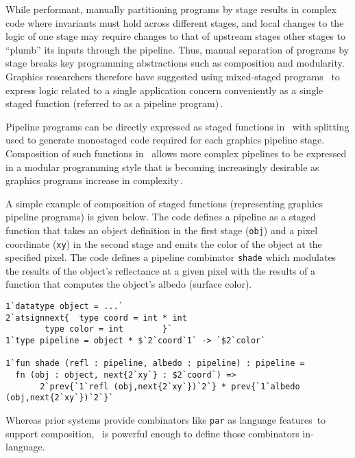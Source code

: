 While performant, manually partitioning programs by stage results in
complex code where invariants must hold across different stages, and
local changes to the logic of one stage may require changes to that of
upstream stages other stages to ``plumb'' its inputs through the
pipeline.  Thus, manual separation of programs by stage breaks key
programming abstractions such as composition and modularity.  Graphics
researchers therefore have suggested using mixed-staged programs
\,\cite{Proudfoot:2001,Foley:2011,He:2014} to express logic related to
a single application concern conveniently as a single staged function
(referred to as a pipeline program)\,\cite{Foley:2011}.

Pipeline programs can be directly expressed as staged functions in
\lang\ with splitting used to generate monostaged code required for
each graphics pipeline stage. Composition of such functions in
\lang\ allows more complex pipelines to be expressed in a modular
programming style that is becoming increasingly desirable as graphics
programs increase in complexity\,\cite{Foley:2011,He:2014}.

A simple example of composition of staged functions (representing graphics
pipeline programs) is given below.  The code defines a pipeline as a
staged function that takes an object definition in the first stage
(\texttt{obj}) and a pixel coordinate (\texttt{xy}) in the second
stage and emits the color of the object at the specified pixel. The
code defines a pipeline combinator \texttt{shade} which modulates the
results of the object's reflectance at a given pixel with the results
of a function that computes the object's albedo (surface color).
%
\begin{lstlisting} 
1`datatype object = ...`
2`atsignnext{  type coord = int * int
        type color = int        }`
1`type pipeline = object * $`2`coord`1` -> `$2`color`

1`fun shade (refl : pipeline, albedo : pipeline) : pipeline =
  fn (obj : object, next{2`xy`} : $2`coord`) =>
       2`prev{`1`refl (obj,next{2`xy`})`2`} * prev{`1`albedo (obj,next{2`xy`})`2`}`
\end{lstlisting}
%
Whereas prior systems provide combinators like \texttt{par} as
language features\,\cite{Foley:2011} to support composition, \lang\ is
powerful enough to define those combinators in-language.